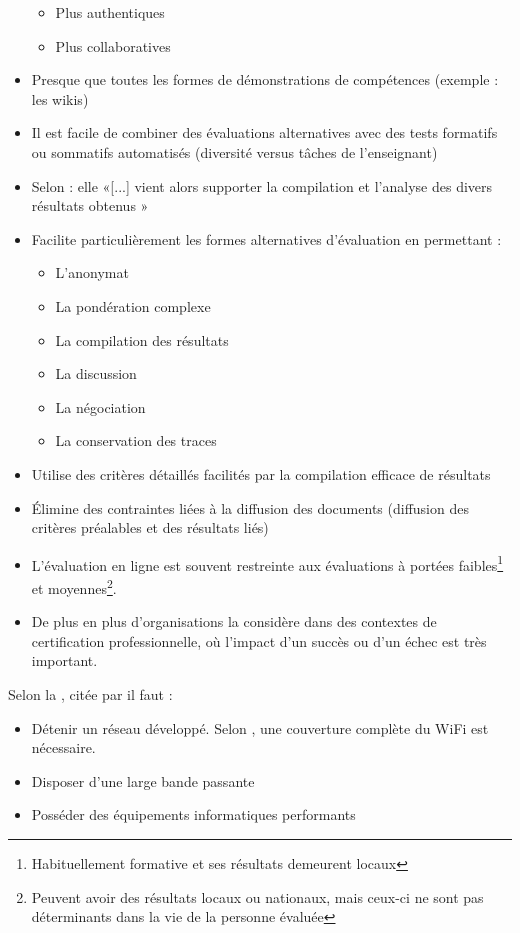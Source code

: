 \documentclass[aspectratio=169]{beamer}
\begin{document}
\begin{frame}[allowframebreaks]
\begin{description}
\begin{itemize}
\begin {itemize}
									\item Plus authentiques
									\item Plus collaboratives
								\end{itemize}
						\item Presque que toutes les formes de démonstrations de compétences (exemple : les wikis)
						\item Il est facile de combiner des évaluations alternatives avec des tests formatifs ou sommatifs automatisés (diversité versus tâches de l'enseignant)						
						\item Selon \citet{audet2011a} : elle «[...] vient alors supporter la compilation et l'analyse des divers résultats obtenus »
						\item Facilite particulièrement les formes alternatives d'évaluation en permettant :
					 	
					 	\begin {itemize}
									\item L'anonymat
									\item La pondération complexe
									\item La compilation des résultats
									\item La discussion
									\item La négociation
									\item La conservation des traces
						\end{itemize}
						\item Utilise des critères détaillés facilités par la compilation efficace de résultats
						\item Élimine des contraintes liées à la diffusion des documents (diffusion des critères préalables et des résultats liés)
						\item  L'évaluation en ligne est souvent restreinte aux évaluations à portées faibles\footnote{Habituellement formative et ses résultats demeurent locaux} et moyennes\footnote{Peuvent avoir des résultats locaux ou nationaux, mais ceux-ci ne sont pas déterminants dans la vie de la personne évaluée}.
						\item De plus en plus d'organisations la considère dans des contextes de certification professionnelle, où l'impact d'un succès ou d'un échec est très important.	
						\end{itemize}								
					\item[Les enjeux technologiques] Selon la \citet{NorthCarolina2013}, citée par \citet{Lamontagne2013} il faut :
						\begin {itemize}
							\item Détenir un réseau développé. Selon \citet{Stansbury2013B}, une couverture complète du WiFi est nécessaire.			\item Disposer d'une large bande passante
							\item Posséder des équipements informatiques performants
						\end{itemize} 
					

\end{description}
\end{frame}
\end{document}
